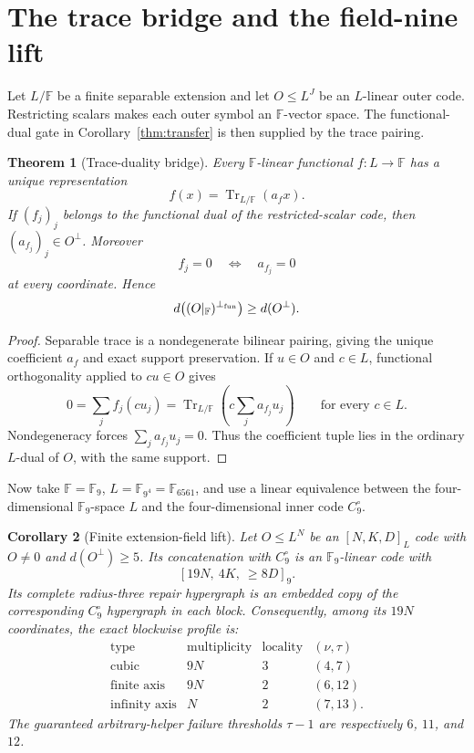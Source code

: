 \documentclass[11pt]{article}
\newtheorem{theorem}{Theorem}[section]
\newtheorem{corollary}[theorem]{Corollary}
\theoremstyle{definition}
\theoremstyle{remark}
\newcommand{\F}{\mathbb{F}}
\newcommand{\Tr}{\operatorname{Tr}}
\begin{document}
\section{The trace bridge and the field-nine lift}
\label{sec:trace}

Let $L/\F$ be a finite separable extension and let $O\leq L^J$ be an
$L$-linear outer code.  Restricting scalars makes each outer symbol an
$\F$-vector space.  The functional-dual gate in
Corollary~\ref{thm:transfer} is then supplied by the trace pairing.

\begin{theorem}[Trace-duality bridge]\label{thm:trace}
Every $\F$-linear functional $f:L\to\F$ has a unique representation
\[
 f(x)=\Tr_{L/\F}(a_fx).
\]
If $(f_j)_j$ belongs to the functional dual of the restricted-scalar code,
then $(a_{f_j})_j\in O^\perp$.  Moreover
\[
 f_j=0\quad\Longleftrightarrow\quad a_{f_j}=0
\]
at every coordinate.  Hence
\[
 d\bigl((O|_\F)^{\perp_{\rm fun}}\bigr)\geq d(O^\perp).
\]
\end{theorem}

\begin{proof}
Separable trace is a nondegenerate bilinear pairing, giving the unique
coefficient $a_f$ and exact support preservation.  If $u\in O$ and
$c\in L$, functional orthogonality applied to $cu\in O$ gives
\[
 0=\sum_j f_j(cu_j)
  =\Tr_{L/\F}\!\left(c\sum_j a_{f_j}u_j\right)
 \qquad\text{for every }c\in L.
\]
Nondegeneracy forces $\sum_ja_{f_j}u_j=0$.  Thus the coefficient tuple lies
in the ordinary $L$-dual of $O$, with the same support.
\end{proof}

Now take $\F=\F_9$, $L=\F_{9^4}=\F_{6561}$, and use a linear equivalence
between the four-dimensional $\F_9$-space $L$ and the four-dimensional inner
code $C_9^\circ$.

\begin{corollary}[Finite extension-field lift]\label{cor:finite-lift}
Let $O\leq L^N$ be an $[N,K,D]_L$ code with $O\ne0$ and
$d(O^\perp)\geq5$.  Its concatenation with $C_9^\circ$ is an $\F_9$-linear code
with
\[
 [19N,\ 4K,\ \geq8D]_9.
\]
Its complete radius-three repair hypergraph is an embedded copy of the
corresponding $C_9^\circ$ hypergraph in each block.  Consequently, among its $19N$
coordinates, the exact blockwise profile is:
\[
\begin{array}{c|c|c|c}
\text{type}&\text{multiplicity}&\text{locality}&(\nu,\tau)\\ \hline
\text{cubic}&9N&3&(4,7)\\
\text{finite axis}&9N&2&(6,12)\\
\text{infinity axis}&N&2&(7,13).
\end{array}
\]
The guaranteed arbitrary-helper failure thresholds $\tau-1$ are
respectively $6$, $11$, and $12$.
\end{corollary}
\end{document}
